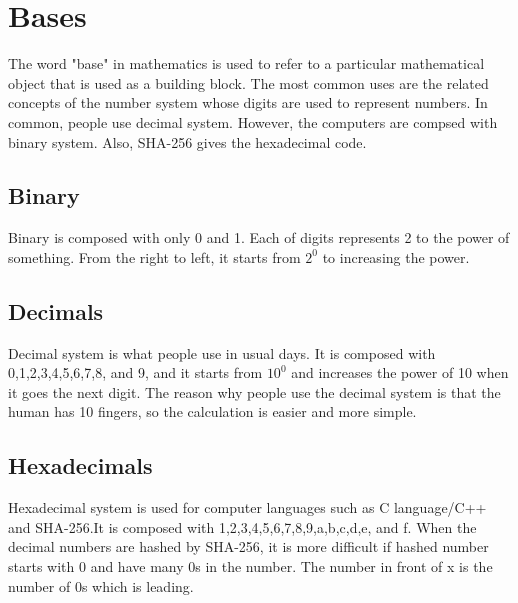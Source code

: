 \chapter{Bases}
The word "base" in mathematics is used to refer to a particular mathematical object that is used as a building block. The most common uses are the related concepts of the number system whose digits are used to represent numbers. In common, people use decimal system. However, the computers are compsed with binary system. Also, SHA-256 gives the hexadecimal code.
\section{Binary}
Binary is composed with only 0 and 1. Each of digits represents 2 to the power of something. From the right to left, it starts from $2^0$ to increasing the power.
	
\section{Decimals}
Decimal system is what people use in usual days. It is composed with 0,1,2,3,4,5,6,7,8, and 9, and it starts from $10^0$ and increases the power of 10 when it goes the next digit. The reason why people use the decimal system is that the human has 10 fingers, so the calculation is easier and more simple. 
\section{Hexadecimals}
Hexadecimal system is used for computer languages such as C language/C++ and SHA-256.It is composed with 1,2,3,4,5,6,7,8,9,a,b,c,d,e, and f. When the decimal numbers are hashed by SHA-256, it is more difficult if hashed number starts with 0 and have many 0s in the number. The number in front of x is the number of 0s which is leading.
